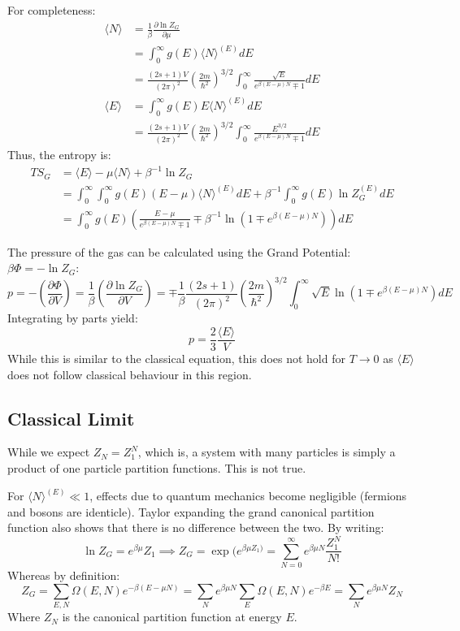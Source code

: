 \documentclass[12pt]{article}
\begin{document}
For completeness:
\begin{align*}
    \langle N \rangle &= \frac{1}{\beta}\frac{\partial \ln Z_G}{\partial \mu} \\
    &= \int^\infty_0 g(E) \langle N \rangle ^{(E)} dE\\
    &= \frac{(2s+1)V}{(2\pi)^2}\left(\frac{2m}{\hbar^2}\right)^{3/2}\int^\infty_0 \frac{\sqrt{E}}{e^{\beta(E-\mu)N}\mp1}dE\\
    \langle E \rangle &= \int^\infty_0g(E)E\langle N \rangle ^{(E)} dE\\
    &= \frac{(2s+1)V}{(2\pi)^2}\left(\frac{2m}{\hbar^2}\right)^{3/2}\int^\infty_0 \frac{E^{3/2}}{{e^{\beta(E-\mu)N}\mp1}}dE
\end{align*}
Thus, the entropy is:
\begin{align*}
    TS_G &= \langle E \rangle - \mu \langle N \rangle + \beta^{-1} \ln Z_G\\
    &= \int^\infty_0 \int^\infty_0 g(E) (E-\mu) \langle N \rangle ^{(E)}  dE + \beta^{-1}\int^\infty_0 g(E) \ln Z_G^{(E)} dE\\
    &= \int^\infty_0 g(E)\left(\frac{E-\mu}{e^{\beta(E-\mu)N}\mp1} \mp \beta^{-1} \ln (1\mp e^{\beta(E-\mu)N})\right)dE
\end{align*}

The pressure of the gas can be calculated using the Grand Potential: $\beta \Phi = -\ln Z_G$:
\[p = -\left(\frac{\partial \Phi}{\partial V}\right)= \frac1\beta\left(\frac{\partial \ln Z_G}{\partial V}\right)=\mp\frac1\beta\frac{(2s+1)}{(2\pi)^2}\left(\frac{2m}{\hbar^2}\right)^{3/2}\int^\infty_0\sqrt{E}\ln(1\mp e^{\beta(E-\mu)N})dE\]
Integrating by parts yield:
\[p = \frac23 \frac{\langle E \rangle}{V}\]
While this is similar to the classical equation, this does not hold for $T\to 0$ as $\langle E \rangle$ does not follow classical behaviour in this region.

\subsection{Classical Limit}

While we expect $Z_N = Z_1^N$, which is, a system with many particles is simply a product of one particle partition functions. This is not true.

For $\langle N \rangle ^{(E)} \ll 1$, effects due to quantum mechanics become negligible (fermions and bosons are identicle). Taylor expanding the grand canonical partition function also shows that there is no difference between the two. By writing:
\[ \ln Z_G = e^{\beta \mu} Z_1 \implies Z_G = \exp{(e^{\beta\mu Z_1)}} = \sum_{N=0}^\infty e^{\beta\mu N}\frac{Z_1^N}{N!}\]
Whereas by definition:
\[ Z_G = \sum_{E,N}\Omega(E,N)e^{-\beta(E-\mu N)} = \sum_Ne^{\beta \mu N}\sum_E\Omega(E,N)e^{-\beta E} =  \sum_Ne^{\beta \mu N}Z_N\]
Where $Z_N$ is the canonical partition function at energy $E$.
\end{document}
